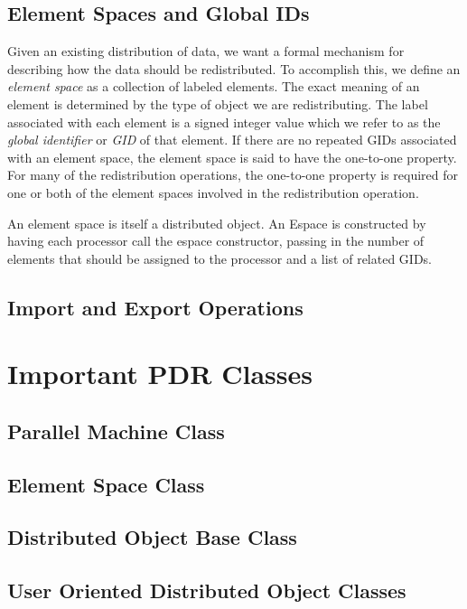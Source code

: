 \documentclass[12pt,relax]{PetraObjectModel}
\begin{document}
\subsection{Element Spaces and Global IDs}

Given an existing distribution of data, we want a formal mechanism for describing
how the data should be redistributed.  To accomplish this, we define an 
{\it element space} as a collection of labeled elements.  The exact meaning of
an element is determined by the type of object we are redistributing.
The label associated with each element is a signed integer value which we refer to as
the {\it global identifier} or {\it GID} of that element.  If there are no 
repeated GIDs associated with an element space, the element space is said to 
have the one-to-one property.  For many of the redistribution operations, the
one-to-one property is required for one or both of the element spaces involved
in the redistribution operation.

An element space is itself a distributed object.  An Espace is constructed by 
having each processor call the espace constructor, passing in the number of
elements that should be assigned to the processor and a list of related GIDs.

\subsection{Import and Export Operations}

\section{Important PDR Classes}

\subsection{Parallel Machine Class}

\subsection{Element Space Class}

\subsection{Distributed Object Base Class}

\subsection{User Oriented Distributed Object Classes}
\end{document}
